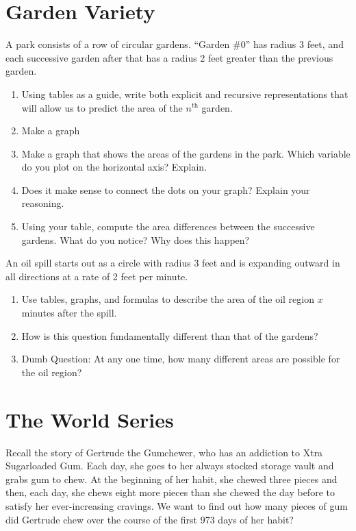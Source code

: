 \documentclass[justified,openany,nofonts]{tufte-book}
\begin{document}
\section{Garden Variety}\label{A:GardenVariety}
\begin{prob}
A park consists of a row of circular gardens.  ``Garden \#0'' has radius 3 feet, and each successive garden after that has a radius 2 feet greater than the previous garden.  
\begin{enumerate}
\item Using tables as a guide, write both explicit and recursive representations that will allow us to predict the area of the $n^\mathrm{th}$ garden.
\item Make a graph 
\item Make a graph that shows the areas of the gardens in the park.  Which variable do you plot on the horizontal axis?  Explain.  
\item Does it make sense to connect the dots on your graph?  Explain your reasoning.  
\item Using your table, compute the area differences between the successive gardens.  What do you notice?  Why does this happen?
\end{enumerate}
\end{prob}
\begin{prob}
An oil spill starts out as a circle with radius 3 feet and is expanding outward in all directions at a rate of 2 feet per minute. 
\begin{enumerate}
\item Use tables, graphs, and formulas to describe the area of the oil region $x$ minutes after the spill.  
\item How is this question fundamentally different than that of the gardens?  
\item Dumb Question:  At any one time, how many different areas are possible for the oil region?

\end{enumerate}
\end{prob}

\newpage
\section{The World Series}\label{A:WorldSeries}

\begin{prob}
Recall the story of Gertrude the Gumchewer, who has an addiction to Xtra Sugarloaded Gum.  Each day, she goes to her always stocked storage vault and grabs gum to chew.  At the beginning of her habit, she chewed three pieces and then, each day, she chews eight more pieces than she chewed the day before to satisfy her ever-increasing cravings. We want to find out how many pieces of gum did Gertrude chew over the course of the first 973 days of her habit?

\end{prob}
\end{document}
